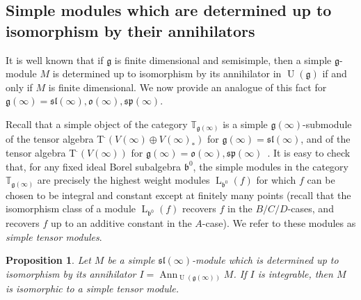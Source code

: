 \documentclass{emsprocart}
\newtheorem{proposition}[theorem]{Proposition}
\begin{document}
\subsection{Simple modules which are determined up to isomorphism by their annihilators}\label{SSnew}
It is well known that if $\mathfrak g$ is finite dimensional and semisimple, then a simple $\mathfrak g$-module $M$ is determined up to isomorphism by its annihilator in $\operatorname{U}(\mathfrak g)$ if and only if $M$ is finite dimensional. We now provide an analogue of this fact for $\mathfrak g(\infty)=\mathfrak{sl}(\infty), \mathfrak o(\infty), \mathfrak{sp}(\infty)$.

Recall that a simple object of the category $\mathbb T_{\mathfrak g(\infty)}$ is a simple $\mathfrak g(\infty)$-submodule of the tensor algebra T$^\cdot(V(\infty)\oplus V(\infty)_*)$ for $\mathfrak g(\infty)=\mathfrak{sl}(\infty)$, and of the tensor algebra T$^\cdot(V(\infty))$ for $\mathfrak g(\infty)=\mathfrak o(\infty), \mathfrak{sp}(\infty)$~\cite{DPS, PS}. It is easy to check that, for any fixed ideal Borel subalgebra $\mathfrak b^0$, the simple modules in the category $\mathbb T_{\mathfrak g(\infty)}$ are precisely the highest weight modules $\operatorname{L}_{\mathfrak b^0}(f)$ for which $f$ can be chosen to be integral and constant except at finitely many points (recall that the isomorphism class of a module $\operatorname{L}_{\mathfrak b^0}(f)$ recovers $f$ in the $B/C/D$-cases, and recovers $f$ up to an additive constant in the $A$-case).
We refer to these modules as {\it simple tensor modules}.
\begin{proposition}\label{P59} Let $M$ be a simple $\mathfrak{sl}(\infty)$-module which is determined up to isomorphism by its annihilator $I=\operatorname{Ann}_{\operatorname{U}(\mathfrak g(\infty))}M$. If $I$ is integrable, then $M$ is isomorphic to a simple tensor module.\end{proposition}
\end{document}
